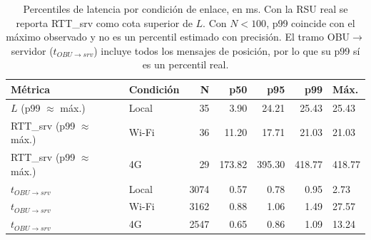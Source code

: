 \begin{table}[H]
\centering
\caption{Percentiles de latencia por condición de enlace, en ms. Con la RSU real se reporta RTT\_srv como cota superior de $L$. Con $N < 100$, p99 coincide con el máximo observado y no es un percentil estimado con precisión. El tramo OBU$\to$servidor ($t_{OBU\to srv}$) incluye todos los mensajes de posición, por lo que su p99 sí es un percentil real.}
\label{tab:latencia_percentiles}
\small
\begin{tabular}{llrrrrl}
\toprule
\textbf{Métrica} & \textbf{Condición} & \textbf{N} & \textbf{p50} & \textbf{p95} & \textbf{p99} & \textbf{Máx.} \\
\midrule
$L$ (p99 $\approx$ máx.) & Local & 35 & 3.90 & 24.21 & 25.43 & 25.43 \\
RTT\_srv (p99 $\approx$ máx.) & Wi-Fi & 36 & 11.20 & 17.71 & 21.03 & 21.03 \\
RTT\_srv (p99 $\approx$ máx.) & 4G & 29 & 173.82 & 395.30 & 418.77 & 418.77 \\
$t_{OBU\to srv}$ & Local & 3074 & 0.57 & 0.78 & 0.95 & 2.73 \\
$t_{OBU\to srv}$ & Wi-Fi & 3162 & 0.88 & 1.06 & 1.49 & 27.57 \\
$t_{OBU\to srv}$ & 4G & 2547 & 0.65 & 0.86 & 1.09 & 13.24 \\
\bottomrule
\end{tabular}
\end{table}
